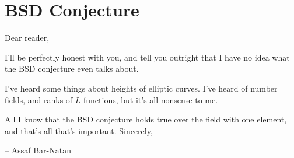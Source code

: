 \setlength\parindent{12pt}

\setcounter{section}{0}

\section{BSD Conjecture}
Dear reader,

I'll be perfectly honest with you, and tell you outright that I have
no idea what the BSD conjecture even talks about.

I've heard some things about heights of elliptic curves. I've 
heard of number fields, and ranks of $L$-functions, but it's all 
nonsense to me.

All I know that the BSD conjecture holds true over the 
field with one element, and that's all that's important.
Sincerely,\\
\begin{flushright}
  -- Assaf Bar-Natan
\end{flushright}
\setlength\parindent{0pt}
